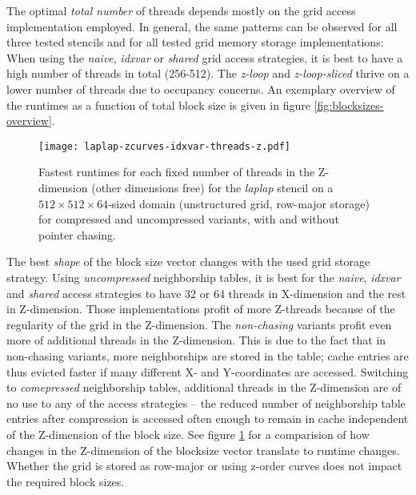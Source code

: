 The optimal \emph{total number} of threads depends mostly on the grid access implementation employed. In general, the same patterns can be observed for all three tested stencils and for all tested grid memory storage implementations: When using the \emph{naive}, \emph{idxvar} or \emph{shared} grid access strategies, it is best to have a high number of threads in total (256-512). The \emph{z-loop} and \emph{z-loop-sliced} thrive on a lower number of threads due to occupancy concerns. An exemplary overview of the runtimes as a function of total block size is given in figure \ref{fig:blocksizes-overview}.

\begin{figure}
	\texttt{[image: laplap-zcurves-idxvar-threads-z.pdf]} %
	\caption{\label{fig:blocksizes-z}Fastest runtimes for each fixed number of threads in the Z-dimension (other dimensions free) for the \emph{laplap} stencil on a $512\times 512\times 64$-sized domain (unstructured grid, row-major storage) for compressed and uncompressed variants, with and without pointer chasing.}
\end{figure}

The best \emph{shape} of the block size vector changes with the used grid storage strategy. Using \emph{uncompressed} neighborship tables, it is best for the \emph{naive}, \emph{idxvar} and \emph{shared} access strategies to have 32 or 64 threads in X-dimension and the rest in Z-dimension. Those implementations profit of more Z-threads because of the regularity of the grid in the Z-dimension. The \emph{non-chasing} variants profit even more of additional threads in the Z-dimension. This is due to the fact that in non-chasing variants, more neighborships are stored in the table; cache entries are thus evicted faster if many different X- and Y-coordinates are accessed. Switching to \emph{comepressed} neighborship tables, additional threads in the Z-dimension are of no use to any of the access strategies -- the reduced number of neighborship table entries after compression is accessed often enough to remain in cache independent of the Z-dimension of the block size. See figure \ref{fig:blocksizes-z} for a comparision of how changes in the Z-dimension of the blocksize vector translate to runtime changes. Whether the grid is stored as row-major or using z-order curves does not impact the required block sizes.

